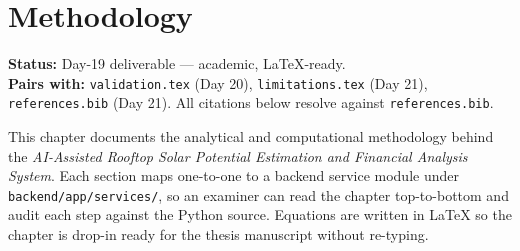 %
%

\providecommand{\degC}{\,^{\circ}\mathrm{C}}
\providecommand{\COtwo}{\mathrm{CO_{2}}}

\chapter{Methodology}
\label{ch:methodology}

\noindent\textbf{Status:} Day-19 deliverable --- academic, LaTeX-ready.\\
\textbf{Pairs with:} \texttt{validation.tex} (Day 20),
\texttt{limitations.tex} (Day 21), \texttt{references.bib} (Day 21).
All citations below resolve against \texttt{references.bib}.

\bigskip

This chapter documents the analytical and computational methodology
behind the \emph{AI-Assisted Rooftop Solar Potential Estimation and
Financial Analysis System}. Each section maps one-to-one to a backend
service module under \texttt{backend/app/services/}, so an examiner
can read the chapter top-to-bottom and audit each step against the
Python source. Equations are written in \LaTeX{} so the chapter is
drop-in ready for the thesis manuscript without re-typing.


